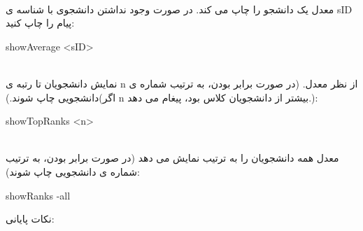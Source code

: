 \documentclass[]{article}
\begin{document}
\noindent
\\معدل یک دانشجو را چاپ می کند. در صورت وجود نداشتن دانشجوی با شناسه ی sID  پیام   را چاپ کنید:
\begin{tcolorbox}[boxrule=0pt]
	\begin{latin}
  	  \large{
  	  	showAverage <sID>
		}
	\end{latin}
\end{tcolorbox}
\noindent
\\نمایش دانشجویان تا رتبه ی n از نظر معدل. (در صورت برابر بودن، به ترتیب شماره ی دانشجویی چاپ شوند.)(اگر n بیشتر از دانشجویان کلاس بود، پیغام   می دهد.):
\begin{tcolorbox}[boxrule=0pt]
	\begin{latin}
		\large{
			showTopRanks <n>
		}
	\end{latin}
\end{tcolorbox}
\noindent
\\معدل همه دانشجویان را به ترتیب نمایش می دهد (در صورت برابر بودن، به ترتیب شماره ی دانشجویی چاپ شوند):
\begin{tcolorbox}[boxrule=0pt]
	\begin{latin}
  	  \large{
  	  	showRanks -all
		}
	\end{latin}
\end{tcolorbox}
\newpage
نکات پایانی:\\\\
\end{document}

